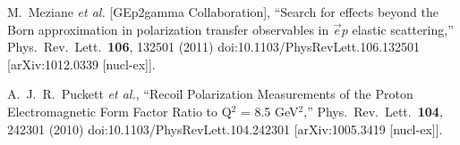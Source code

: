 \documentclass[11pt]{article}
\begin{document}
\begin{thebibliography}{99}
            M.~Meziane {\it et al.} [GEp2gamma Collaboration],
            ``Search for effects beyond the Born approximation in polarization transfer observables in $\vec{e}p$ elastic scattering,''
            Phys.\ Rev.\ Lett.\  {\bf 106}, 132501 (2011)
            doi:10.1103/PhysRevLett.106.132501
            [arXiv:1012.0339 [nucl-ex]].

            A.~J.~R.~Puckett {\it et al.},
            ``Recoil Polarization Measurements of the Proton Electromagnetic Form Factor Ratio to Q$^2$ = 8.5 GeV$^2$,''
            Phys.\ Rev.\ Lett.\  {\bf 104}, 242301 (2010)
            doi:10.1103/PhysRevLett.104.242301
            [arXiv:1005.3419 [nucl-ex]].

    \end{thebibliography}
    \nocite{*}
\end{document}
